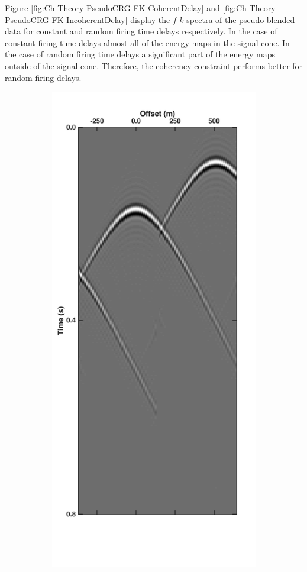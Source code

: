 Figure \ref{fig:Ch-Theory-PseudoCRG-FK-CoherentDelay} and \ref{fig:Ch-Theory-PseudoCRG-FK-IncoherentDelay} display the $f$-$k$-spectra of the pseudo-blended data for constant and random firing time delays respectively. In the case of constant firing time delays almost all of the energy maps in the signal cone. In the case of random firing time delays a significant part of the energy maps outside of the signal cone. Therefore, the coherency constraint performs better for random firing delays.  

\begin{figure}
	\centering
	\begin{subfigure}[b]{0.3\textwidth}
		\centering
		\includegraphics[width = \textwidth]{Plots/Mahdad/25iter/TimeDelay/Pseudo-DeblendedCRG_rec30_coh}

\end{subfigure}
\end{figure}
